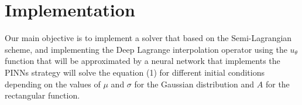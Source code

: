 \documentclass{article}
\begin{document}

\section{Implementation}
Our main objective is to implement a solver that based on the Semi-Lagrangian scheme, and implementing the Deep Lagrange interpolation operator 
using the $u_\theta$ function that will be approximated by a neural network that implements the PINNs strategy will solve the equation (1) for different initial conditions depending on the values of $\mu$ and $\sigma$ for the Gaussian distribution and $A$ for the rectangular function.





\end{document}
